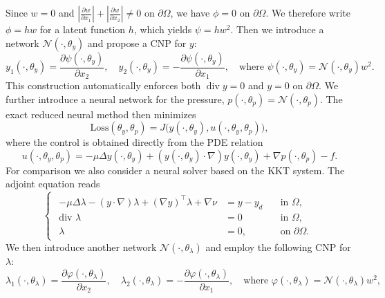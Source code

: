\documentclass{article}
\numberwithin{equation}{section}
\begin{document}
Since $w=0$ and $|\frac{\partial w}{\partial x_1}| + |\frac{\partial w}{\partial x_2}|\ne 0$ on $\partial \Omega$, we have $\phi=0$ on $\partial\Omega$. We therefore write $\phi = hw$ for a latent function $h$, which yields $\psi = h w^2$.
Then we introduce a network $\mathcal{N}(\cdot,\theta_y)$ and propose a CNP for $y$:
\begin{equation}
     y_1(\cdot,\theta_y)=\frac{\partial\psi(\cdot,\theta_y)}{\partial x_2},\quad y_2(\cdot,\theta_y)=-\frac{\partial\psi(\cdot,\theta_y)}{\partial x_1}, \quad \text{where }\psi(\cdot,\theta_y) = \mathcal{N}(\cdot,\theta_y)w^2.
\end{equation}
This construction automatically enforces both $\operatorname{div}y=0$ and $y=0$ on $\partial\Omega$. We further introduce a neural network for the pressure, $p(\cdot,\theta_p)=\mathcal N(\cdot,\theta_p)$. The exact reduced neural method then minimizes
\begin{equation}
\text{Loss}(\theta_y,\theta_p)
=
J\big(y(\cdot,\theta_y),u(\cdot,\theta_y,\theta_p)\big),
\end{equation}
where the control is obtained directly from the PDE relation
\begin{equation}
u(\cdot,\theta_y,\theta_p)
=
-\mu \Delta y(\cdot,\theta_y)
+
(y(\cdot,\theta_y)\cdot\nabla)y(\cdot,\theta_y)
+
\nabla p(\cdot,\theta_p)
-
f .
\end{equation}
For comparison we also consider a neural solver based on the KKT system. The adjoint equation reads
\begin{equation}
\begin{cases}
\begin{aligned}
     -\mu \Delta\lambda - (y\cdot\nabla)\lambda+(\nabla y )^\top\lambda + \nabla\nu &=y-y_d\quad &\text{in }\Omega,\\
    \text{div }\lambda&=0 \quad &\text{in } \Omega,\\
    \lambda &= 0,\quad &\text{on }\partial\Omega.
\end{aligned}
\end{cases}
\end{equation}
We then introduce another network $\mathcal{N}(\cdot,\theta_\lambda)$ and employ the following CNP for $\lambda$:
\begin{equation}
\lambda_1(\cdot,\theta_\lambda)=\frac{\partial\varphi(\cdot,\theta_\lambda)}{\partial x_2},\quad \lambda_2(\cdot,\theta_\lambda)=-\frac{\partial\varphi(\cdot,\theta_\lambda)}{\partial x_1},\quad \text{where }\varphi(\cdot,\theta_\lambda) = \mathcal{N}(\cdot,\theta_\lambda)w^2,
\end{equation}
\end{document}
